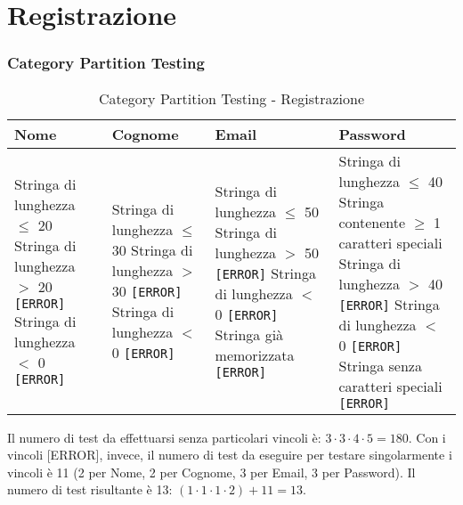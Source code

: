 
\section{Registrazione}

\subsubsection*{Category Partition Testing}


\begin{table}[H]
	\centering
	\footnotesize
	\renewcommand{\arraystretch}{1.3}
	\begin{tabular}{|p{3cm}|p{3cm}|p{4cm}|p{5cm}|}
		\hline
		\textbf{Nome} & \textbf{Cognome} & \textbf{Email} & \textbf{Password} \\
		\hline
		Stringa di lunghezza $\leq$ 20 \newline
		Stringa di lunghezza $>$ 20 \texttt{[ERROR]} \newline
		Stringa di lunghezza $<$ 0 \texttt{[ERROR]} &

		Stringa di lunghezza $\leq$ 30 \newline
		Stringa di lunghezza $>$ 30 \texttt{[ERROR]} \newline
		Stringa di lunghezza $<$ 0 \texttt{[ERROR]} &

		Stringa di lunghezza $\leq$ 50 \newline
		Stringa di lunghezza $>$ 50 \texttt{[ERROR]} \newline
		Stringa di lunghezza $<$ 0 \texttt{[ERROR]} \newline
		Stringa già memorizzata \texttt{[ERROR]} &

		Stringa di lunghezza $\leq$ 40 \newline
		Stringa contenente $\geq$ 1 caratteri speciali \newline
		Stringa di lunghezza $>$ 40 \texttt{[ERROR]} \newline
		Stringa di lunghezza $<$ 0 \texttt{[ERROR]} \newline
		Stringa senza caratteri speciali \texttt{[ERROR]} \\
		\hline
	\end{tabular}
	\caption{Category Partition Testing - Registrazione}
\end{table}

\noindent Il numero di test da effettuarsi senza particolari vincoli è: $3 \cdot 3 \cdot 4 \cdot 5 = 180$.
\noindent Con i vincoli [ERROR], invece, il numero di test da eseguire per testare singolarmente i vincoli è 11 (2 per Nome, 2 per Cognome, 3 per Email, 3 per Password).
\noindent Il numero di test risultante è 13: $(1 \cdot 1 \cdot 1 \cdot 2) + 11 = 13$.

